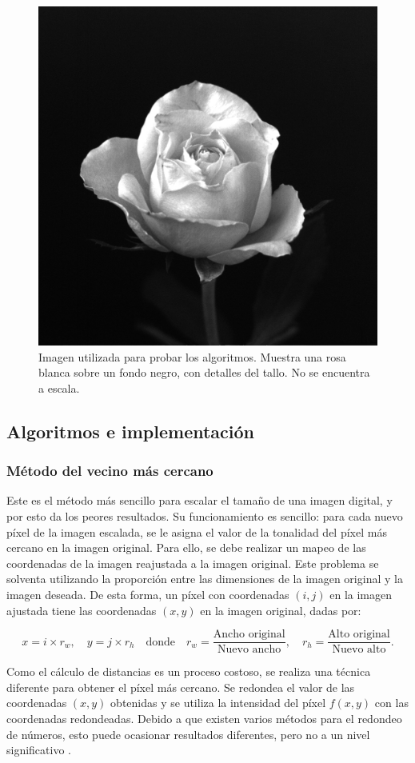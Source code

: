 \documentclass[12pt]{article}
\begin{document}
\begin{figure}[H]
	\centering
	\includegraphics[width=0.5\linewidth]{imgs/rose}
	\caption{Imagen utilizada para probar los algoritmos. Muestra una rosa blanca sobre un fondo negro, con detalles del tallo. No se encuentra a escala.}
	\label{fig:rose}
\end{figure}


\subsection{Algoritmos e implementación}

\subsubsection{Método del vecino más cercano}
Este es el método más sencillo para escalar el tamaño de una imagen digital, y por esto da los peores resultados. Su funcionamiento es sencillo: para cada nuevo píxel de la imagen escalada, se le asigna el valor de la tonalidad del píxel más cercano en la imagen original. Para ello, se debe realizar un mapeo de las coordenadas de la imagen reajustada a la imagen original. Este problema se solventa utilizando la proporción entre las dimensiones de la imagen original y la imagen deseada. De esta forma, un píxel con coordenadas $(i, j)$ en la  imagen ajustada tiene las coordenadas $(x,y)$ en la imagen original, dadas por:

$$
x = i \times r_w, \quad y = j \times r_h 
\quad \text{donde} \quad
r_w = \dfrac{\text{Ancho original}}{\text{Nuevo ancho}}, 
\quad
r_h = \dfrac{\text{Alto original}}{\text{Nuevo alto}}.
$$

Como el cálculo de distancias es un proceso costoso, se realiza una técnica diferente para obtener el píxel más cercano. Se redondea el valor de las coordenadas $(x,y)$ obtenidas y se utiliza la intensidad del píxel $f(x,y)$ con las coordenadas redondeadas. Debido a que existen varios métodos para el redondeo de números, esto puede ocasionar resultados diferentes, pero no a un nivel significativo \cite{wojcickiNearestNeighbourInterpolation2020}. 
\end{document}
